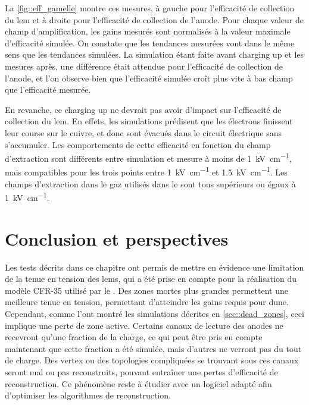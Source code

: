       La \autoref{fig::eff_gamelle} montre ces mesures, à gauche pour l'efficacité de collection du \gls{lem} et à droite pour l'efficacité de collection de l'anode. Pour chaque valeur de champ d'amplification, les gains mesurés sont normalisés à la valeur maximale d'efficacité simulée. On constate que les tendances mesurées vont dans le même sens que les tendances simulées. La simulation étant faite avant charging up et les mesures après, une différence était attendue pour l'efficacité de collection de l'anode, et l'on observe bien que l'efficacité simulée croît plus vite à bas champ que l'efficacité mesurée.

      En revanche, ce charging up ne devrait pas avoir d'impact sur l'efficacité de collection du \gls{lem}. En effets, les simulations prédisent que les électrons finissent leur course sur le cuivre, et donc sont évacués dans le circuit électrique sans s'accumuler. Les comportements de cette efficacité en fonction du champ d'extraction sont différents entre simulation et mesure à moins de \SI{1}{\kilo\volt\per\centi\meter}, mais compatibles pour les trois points entre \SI{1}{\kilo\volt\per\centi\meter} et \SI{1.5}{\kilo\volt\per\centi\meter}. Les champs d'extraction dans le gaz utilisés dans le \TOO{} sont tous supérieurs ou égaux à \SI{1}{\kilo\volt\per\centi\meter}.

       
  \section{Conclusion et perspectives}

    Les tests décrits dans ce chapitre ont permis de mettre en évidence une limitation de la tenue en tension des \glspl{lem}, qui a été prise en compte pour la réalisation du modèle CFR-35 utilisé par le \SSS{}. Des zones mortes plus grandes permettent une meilleure tenue en tension, permettant d'atteindre les gains requis pour \gls{dune}. Cependant, comme l'ont montré les simulations décrites en \autoref{sec::dead_zones}, ceci implique une perte de zone active. Certains canaux de lecture des anodes ne recevront qu'une fraction de la charge, ce qui peut être pris en compte maintenant que cette fraction a été simulée, mais d'autres ne verront pas du tout de charge. Des vertex ou des topologies compliquées se trouvant sous ces canaux seront mal ou pas reconstruits, pouvant entraîner une pertes d'efficacité de reconstruction. Ce phénomène reste à étudier avec un logiciel adapté afin d'optimiser les algorithmes de reconstruction.

